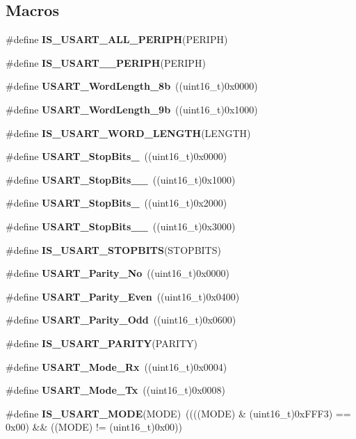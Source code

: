 \subsection*{Macros}
\begin{DoxyCompactItemize}
\item 
\#define \textbf{ I\+S\+\_\+\+U\+S\+A\+R\+T\+\_\+\+A\+L\+L\+\_\+\+P\+E\+R\+I\+PH}(P\+E\+R\+I\+PH)
\item 
\#define \textbf{ I\+S\+\_\+\+U\+S\+A\+R\+T\+\_\+\_\+\+P\+E\+R\+I\+PH}(P\+E\+R\+I\+PH)
\item 
\#define \textbf{ U\+S\+A\+R\+T\+\_\+\+Word\+Length\+\_\+8b}~((uint16\+\_\+t)0x0000)
\item 
\#define \textbf{ U\+S\+A\+R\+T\+\_\+\+Word\+Length\+\_\+9b}~((uint16\+\_\+t)0x1000)
\item 
\#define \textbf{ I\+S\+\_\+\+U\+S\+A\+R\+T\+\_\+\+W\+O\+R\+D\+\_\+\+L\+E\+N\+G\+TH}(L\+E\+N\+G\+TH)
\item 
\#define \textbf{ U\+S\+A\+R\+T\+\_\+\+Stop\+Bits\+\_}~((uint16\+\_\+t)0x0000)
\item 
\#define \textbf{ U\+S\+A\+R\+T\+\_\+\+Stop\+Bits\+\_\+\_}~((uint16\+\_\+t)0x1000)
\item 
\#define \textbf{ U\+S\+A\+R\+T\+\_\+\+Stop\+Bits\+\_}~((uint16\+\_\+t)0x2000)
\item 
\#define \textbf{ U\+S\+A\+R\+T\+\_\+\+Stop\+Bits\+\_\+\_}~((uint16\+\_\+t)0x3000)
\item 
\#define \textbf{ I\+S\+\_\+\+U\+S\+A\+R\+T\+\_\+\+S\+T\+O\+P\+B\+I\+TS}(S\+T\+O\+P\+B\+I\+TS)
\item 
\#define \textbf{ U\+S\+A\+R\+T\+\_\+\+Parity\+\_\+\+No}~((uint16\+\_\+t)0x0000)
\item 
\#define \textbf{ U\+S\+A\+R\+T\+\_\+\+Parity\+\_\+\+Even}~((uint16\+\_\+t)0x0400)
\item 
\#define \textbf{ U\+S\+A\+R\+T\+\_\+\+Parity\+\_\+\+Odd}~((uint16\+\_\+t)0x0600)
\item 
\#define \textbf{ I\+S\+\_\+\+U\+S\+A\+R\+T\+\_\+\+P\+A\+R\+I\+TY}(P\+A\+R\+I\+TY)
\item 
\#define \textbf{ U\+S\+A\+R\+T\+\_\+\+Mode\+\_\+\+Rx}~((uint16\+\_\+t)0x0004)
\item 
\#define \textbf{ U\+S\+A\+R\+T\+\_\+\+Mode\+\_\+\+Tx}~((uint16\+\_\+t)0x0008)
\item 
\#define \textbf{ I\+S\+\_\+\+U\+S\+A\+R\+T\+\_\+\+M\+O\+DE}(M\+O\+DE)~((((M\+O\+DE) \& (uint16\+\_\+t)0x\+F\+F\+F3) == 0x00) \&\& ((\+M\+O\+D\+E) != (uint16\+\_\+t)0x00))

\end{DoxyCompactItemize}
